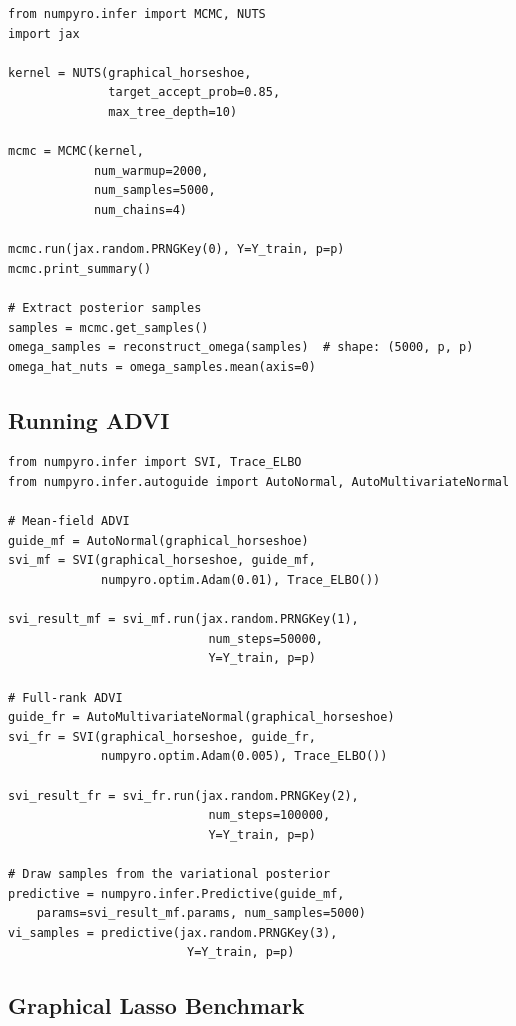 \documentclass[11pt,a4paper]{article}
\begin{document}
\begin{lstlisting}[caption={Running NUTS inference.}]
from numpyro.infer import MCMC, NUTS
import jax

kernel = NUTS(graphical_horseshoe,
              target_accept_prob=0.85,
              max_tree_depth=10)

mcmc = MCMC(kernel,
            num_warmup=2000,
            num_samples=5000,
            num_chains=4)

mcmc.run(jax.random.PRNGKey(0), Y=Y_train, p=p)
mcmc.print_summary()

# Extract posterior samples
samples = mcmc.get_samples()
omega_samples = reconstruct_omega(samples)  # shape: (5000, p, p)
omega_hat_nuts = omega_samples.mean(axis=0)
\end{lstlisting}

\subsection{Running ADVI}

\begin{lstlisting}[caption={Running ADVI inference.}]
from numpyro.infer import SVI, Trace_ELBO
from numpyro.infer.autoguide import AutoNormal, AutoMultivariateNormal

# Mean-field ADVI
guide_mf = AutoNormal(graphical_horseshoe)
svi_mf = SVI(graphical_horseshoe, guide_mf,
             numpyro.optim.Adam(0.01), Trace_ELBO())

svi_result_mf = svi_mf.run(jax.random.PRNGKey(1),
                            num_steps=50000,
                            Y=Y_train, p=p)

# Full-rank ADVI
guide_fr = AutoMultivariateNormal(graphical_horseshoe)
svi_fr = SVI(graphical_horseshoe, guide_fr,
             numpyro.optim.Adam(0.005), Trace_ELBO())

svi_result_fr = svi_fr.run(jax.random.PRNGKey(2),
                            num_steps=100000,
                            Y=Y_train, p=p)

# Draw samples from the variational posterior
predictive = numpyro.infer.Predictive(guide_mf,
    params=svi_result_mf.params, num_samples=5000)
vi_samples = predictive(jax.random.PRNGKey(3),
                         Y=Y_train, p=p)
\end{lstlisting}

\subsection{Graphical Lasso Benchmark}
\end{document}
